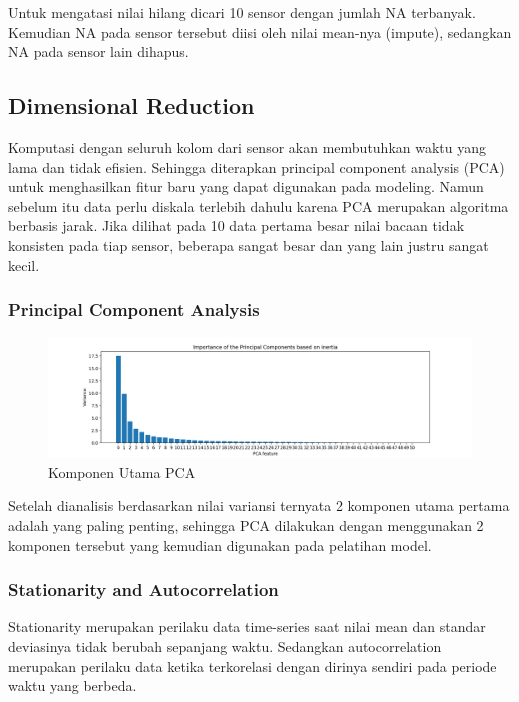    Untuk mengatasi nilai hilang dicari 10 sensor dengan jumlah NA terbanyak. Kemudian NA pada sensor tersebut diisi oleh nilai mean-nya (impute), sedangkan NA pada sensor lain dihapus.

    \subsection{Dimensional Reduction}

    Komputasi dengan seluruh kolom dari sensor akan membutuhkan waktu yang lama dan tidak efisien. Sehingga diterapkan principal component analysis (PCA) untuk menghasilkan fitur baru yang dapat digunakan pada modeling. Namun sebelum itu data perlu diskala terlebih dahulu karena PCA merupakan algoritma berbasis jarak. Jika dilihat pada 10 data pertama besar nilai bacaan tidak konsisten pada tiap sensor, beberapa sangat besar dan yang lain justru sangat kecil.

        \subsubsection{Principal Component Analysis}

        \begin{figure}[h]
            \centerline{\includegraphics[width=1.2\textwidth]{resources/Acuan/PCA_Plot.png}}
            \caption{Komponen Utama PCA}
        \end{figure}

        Setelah dianalisis berdasarkan nilai variansi ternyata 2 komponen utama pertama adalah yang paling penting, sehingga PCA dilakukan dengan menggunakan 2 komponen tersebut yang kemudian digunakan pada pelatihan model.

        \subsubsection{Stationarity and Autocorrelation}

        Stationarity merupakan perilaku data time-series saat nilai mean dan standar deviasinya tidak berubah sepanjang waktu. Sedangkan autocorrelation merupakan perilaku data ketika terkorelasi dengan dirinya sendiri pada periode waktu yang berbeda.

